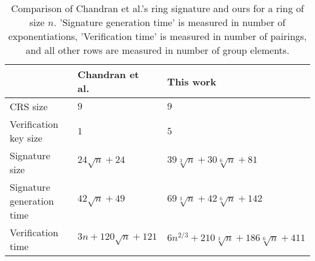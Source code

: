\begin{table}[h]
\begin{center}
\begin{minipage}{\textwidth}
\begin{center}
\begin{tabular}{|l|l|l|}
\hline
                                           & Chandran et al.~\cite{ICALP:ChaGroSah07} & This work \\
\hline\hline
\rule{0pt}{2.5ex}CRS size                  & $9$                                       & $9$       \\ 
\rule{0pt}{2.5ex}Verification key size     & $1$                                       & $5$       \\
\rule{0pt}{2.5ex}Signature size            & $24 \sqrt{n} + 24$                        & $39 \sqrt[3]{n} + 30 \sqrt[6]{n} + 81$\\    
\rule{0pt}{2.5ex}Signature generation time & $42 \sqrt{n} + 49$                        & $69 \sqrt[3]{n} + 42 \sqrt[6]{n} + 142$\\
\rule{0pt}{2.5ex}Verification time         & $3 n + 120 \sqrt{n} + 121$                & $6 n^{2/3} + 210 \sqrt[3]{n} + 186 \sqrt[6]{n} + 411$\\
\hline 
\end{tabular}
\end{center}
\caption{Comparison of Chandran et al.'s ring signature and ours for a ring of size $n$. 'Signature generation time' is measured in number of exponentiations, 'Verification time' is measured in number of pairings, and all other rows are measured in number of group elements.\label{table:eff}}
\end{minipage}
\end{center}
\end{table}
